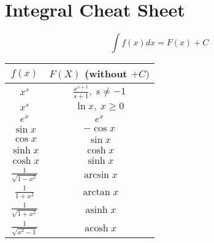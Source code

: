 \documentclass[8pt,a4paper,twocolumn,table]{extarticle}
\DeclareMathOperator{\acosh}{acosh}
\DeclareMathOperator{\asinh}{asinh}
\begin{document}
\section{Integral Cheat Sheet}

\[ \int f(x)dx = F(x) + C \]

\begin{tabular}{| c | c |}
    \hline
    \rowcolor{lightgray} $f(x)$ & $F(X)$ (without $+ C)$               \\
    \hline
    $x^s$                       & $\frac{x^{s + 1}}{s + 1},\ s \ne -1$ \\
    \hline
    $x^s$                       & $\ln x,\ x \ge 0$                    \\
    \hline
    $e^x$                       & $e^x$                                \\
    \hline
    $\sin x$                    & $-\cos x$                            \\
    \hline
    $\cos x$                    & $\sin x$                             \\
    \hline
    $\sinh x$                   & $\cosh x$                            \\
    \hline
    $\cosh x$                   & $\sinh x$                            \\
    \hline
    $\frac{1}{\sqrt{1 - x^2}}$  & $\arcsin x$                          \\
    \hline
    $\frac{1}{1 + x^2}$         & $\arctan x$                          \\
    \hline
    $\frac{1}{\sqrt{1 + x^2}}$  & $\asinh x$                           \\
    \hline
    $\frac{1}{\sqrt{x^2 - 1}}$  & $\acosh x$                           \\
    \hline
\end{tabular}

\end{document}
